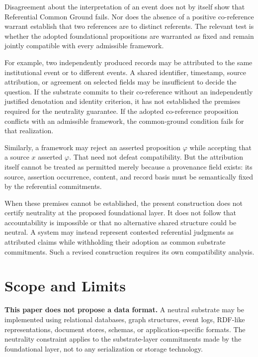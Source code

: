 \documentclass[11pt]{article}
\theoremstyle{plain}
\theoremstyle{definition}
\theoremstyle{remark}
\begin{document}
Disagreement about the interpretation of an event does not by itself
show that Referential Common Ground fails.
Nor does the absence of a positive co-reference warrant establish
that two references are to distinct referents.
The relevant test is whether the adopted foundational propositions
are warranted as fixed and remain jointly compatible with every
admissible framework.

For example, two independently produced records may be attributed
to the same institutional event or to different events.
A shared identifier, timestamp, source attribution, or agreement
on selected fields may be insufficient to decide the question.
If the substrate commits to their co-reference without an independently
justified denotation and identity criterion, it has not established the
premises required for the neutrality guarantee.
If the adopted co-reference proposition conflicts with an admissible
framework, the common-ground condition fails for that realization.

Similarly, a framework may reject an asserted proposition $\varphi$
while accepting that a source $x$ asserted $\varphi$.
That need not defeat compatibility.
But the attribution itself cannot be treated as permitted merely
because a provenance field exists:
its source, assertion occurrence, content, and record basis
must be semantically fixed by the referential commitments.

When these premises cannot be established, the present construction
does not certify neutrality at the proposed foundational layer.
It does not follow that accountability is impossible or that no
alternative shared structure could be neutral.
A system may instead represent contested referential judgments
as attributed claims while withholding their adoption as common
substrate commitments.
Such a revised construction requires its own compatibility analysis.

\section{Scope and Limits}
\label{sec:non-goals}

\textbf{This paper does not propose a data format.}
A neutral substrate may be implemented using relational databases,
graph structures, event logs, RDF-like representations,
document stores, schemas, or application-specific formats.
The neutrality constraint applies to the substrate-layer commitments
made by the foundational layer,
not to any serialization or storage technology.
\end{document}
